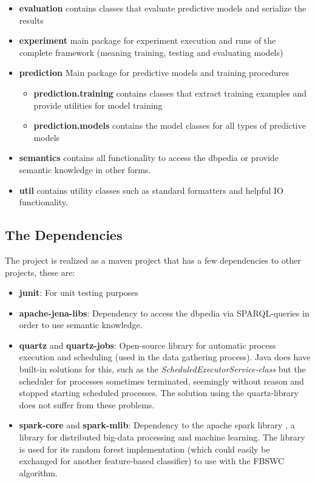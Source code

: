 \begin{itemize}
\begin{itemize}
		\item \textbf{episode.unstable\textunderscore experimental\textunderscore lossy\textunderscore counting} Package that contains experimental, less sophisticated classes to experiment with episode mining using the lossy counting algorithm. The contents of this package were not used to generate any final results as presented in chapter \ref{chapter_evaluation}.
	\end{itemize}
	\item \textbf{evaluation} contains classes that evaluate predictive models and serialize the results
	\item \textbf{experiment} main package for experiment execution and runs of the complete framework (meaning training, testing and evaluating models)
	\item \textbf{prediction} Main package for predictive models and training procedures
	\begin{itemize}
		\item \textbf{prediction.training} contains classes that extract training examples and provide utilities for model training
		\item \textbf{prediction.models} contains the model classes for all types of predictive models
	\end{itemize}		
	\item \textbf{semantics} contains all functionality to access the dbpedia \cite{auer2007dbpedia} or provide semantic knowledge in other forms.
	\item \textbf{util} contains utility classes such as standard formatters and helpful IO functionality.
\end{itemize}

\subsection{The Dependencies}
The project is realized as a maven project that has a few dependencies to other projects, these are:

\begin{itemize}
	\item \textbf{junit}: For unit testing purposes
	\item \textbf{apache-jena-libs}: Dependency to access the dbpedia via SPARQL-queries in order to use semantic knowledge.
	\item \textbf{quartz} and \textbf{quartz-jobs}: Open-source library for automatic process execution and scheduling (used in the data gathering process). Java does have built-in solutions for this, such as the \textit{ScheduledExecutorService-class} but the scheduler for processes sometimes terminated, seemingly without reason and stopped starting scheduled processes. The solution using the quartz-library does not suffer from these problems.
	\item \textbf{spark-core} and \textbf{spark-mlib}: Dependency to the apache spark library \cite{meng2016mllib}, a library for distributed big-data processing and machine learning. The library is used for its random forest implementation (which could easily be exchanged for another feature-based classifier) to use with the FBSWC algorithm.
\end{itemize}

